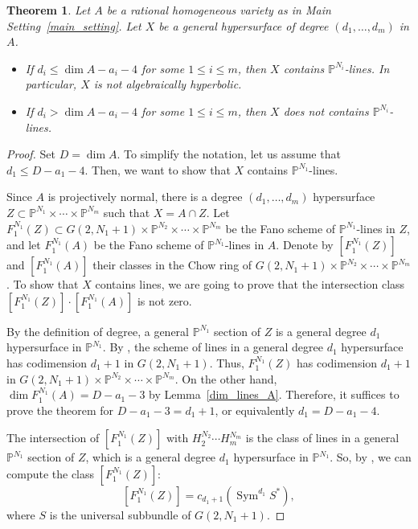 \documentclass[10pt,a4paper]{article}
\numberwithin{equation}{section}
\newtheorem{theorem}{Theorem}[section]
\theoremstyle{definition}
\theoremstyle{remark}
\renewcommand{\P}{\mathbb{P}}
\DeclareMathOperator{\Sym}{Sym}
\begin{document}
\begin{theorem}\label{linestheorem}
    Let $A$ be a rational homogeneous variety as in Main Setting~\ref{main_setting}. Let $X$ be a general hypersurface of degree $(d_1, \hdots , d_m)$ in $A$.
    \begin{itemize}
        \item If $d_i\le \dim A - a_i - 4$ for some $1\le i\le m$, then $X$ contains $\P^{N_i}$-lines. In particular, $X$ is not algebraically hyperbolic.
        \item If $d_i > \dim A - a_i - 4$ for some $1\le i\le m$, then $X$ does not contains $\P^{N_i}$-lines.
    \end{itemize}
\end{theorem}
\begin{proof}
    Set $D = \dim A$. To simplify the notation, let us assume that $d_1\le D-a_1-4$. Then, we want to show that $X$ contains $\P^{N_1}$-lines.

    Since $A$ is projectively normal, there is a degree $(d_1,\hdots,d_m)$ hypersurface $Z\subset \P^{N_1}\times \cdots \times \P^{N_m}$ such that $X = A\cap Z$. Let $F_1^{N_1}(Z)\subset G(2,N_1+1)\times \P^{N_2}\times \cdots \times \P^{N_m}$ be the Fano scheme of $\P^{N_1}$-lines in $Z$, and let $F_1^{N_1}(A)$ be the Fano scheme of $\P^{N_1}$-lines in $A$. Denote by $[F_1^{N_1}(Z)]$ and $[F_1^{N_1}(A)]$ their classes in the Chow ring of $G(2,N_1+1)\times \P^{N_2}\times \cdots \times \P^{N_m}$. To show that $X$ contains lines, we are going to prove that the intersection class $[F_1^{N_1}(Z)]\cdot [F_1^{N_1}(A)]$ is not zero.

    By the definition of degree, a general $\P^{N_1}$ section of $Z$ is a general degree $d_1$ hypersurface in $\P^{N_1}$. By \cite[Theorem 6.34]{3264}, the scheme of lines in a general degree $d_1$ hypersurface has codimension $d_1+1$ in $G(2,N_1+1)$. Thus, $F_1^{N_1}(Z)$ has codimension $d_1+1$ in $G(2,N_1+1)\times \P^{N_2}\times \cdots \times \P^{N_m}$. On the other hand, $\dim F_1^{N_1}(A) = D - a_1 - 3$ by Lemma~\ref{dim_lines_A}. Therefore, it suffices to prove the theorem for $D-a_1-3=d_1+1$, or equivalently $d_1=D-a_1-4$.
        
    The intersection of $[F_1^{N_1}(Z)]$ with $H_2^{N_2}\cdots H_m^{N_m}$ is the class of lines in a general $\P^{N_1}$ section of $Z$, which is a general degree $d_1$ hypersurface in $\P^{N_1}$. So, by \cite[Proposition 6.4]{3264}, we can compute the class $[F_1^{N_1}(Z)]$:
    \[ \left[F_1^{N_1}(Z)\right] = c_{d_1+1}(\Sym^{d_1} S^*), \]
    where $S$ is the universal subbundle of $G(2, N_1+1)$.


\end{proof}
\end{document}

